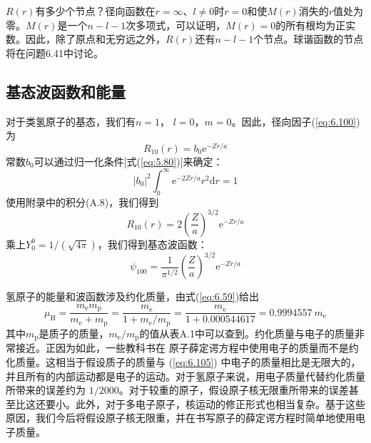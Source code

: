     $R\left(r\right)$有多少个节点？径向函数在$r = \infty$、$l \neq 0$时$r = 0$和使$M\left(r\right)$消失的$r$值处为零。$M\left(r\right)$是一个$n-l-1$次多项式，可以证明，$M\left(r\right) = 0$的所有根均为正实数。因此，除了原点和无穷远之外，$R\left(r\right)$还有$n-l-1$个节点。球谐函数的节点将在问题6.41中讨论。

\subsection*{基态波函数和能量}
    对于类氢原子的基态，我们有$n=1$， $l=0$，$m=0$。因此，径向因子(\ref{eq:6.100})为
    \begin{equation}
        R_{10}\left(r\right) = b_0\mathrm{e}^{-Zr/a}
        \label{eq:6.102}
    \end{equation}
    常数$b_0$可以通过归一化条件[式(\ref{eq:5.80})]来确定：
    \begin{equation*}
        \left|b_0\right|^2\int_{0}^{\infty}\mathrm{e}^{-2Zr/a}r^2\mathrm{d}r = 1
    \end{equation*}
    使用附录中的积分(A.8)，我们得到
    \begin{equation}
        R_{10}\left(r\right) = 2\left(\frac{Z}{a}\right)^{3/2}\mathrm{e}^{-Zr/a}
        \label{eq:6.103}
    \end{equation}
    乘上$Y_0^0 = 1/\left(\sqrt{4\pi}\right)$，我们得到基态波函数：
    \begin{equation}
        \psi_{100} = \frac{1}{\pi^{1/2}}\left(\frac{Z}{a}\right)^{3/2}\mathrm{e}^{-Zr/a}
        \label{eq:6.104}
    \end{equation}

    氢原子的能量和波函数涉及约化质量，由式(\ref{eq:6.59})给出
    \begin{equation}
        \mu_{\mathrm{H}} = \frac{m_{\mathrm{e}}m_{\mathrm{p}}}{m_{\mathrm{e}} + m_{\mathrm{p}}} = \frac{m_{\mathrm{e}}}{1+m_{\mathrm{e}}/m_{\mathrm{p}}} = \frac{m_{\mathrm{e}}}{1+0.000544617} = 0.9994557 \: m_{\mathrm{e}}
        \label{eq:6.105}
    \end{equation}
    其中$m_{\mathrm{p}}$是质子的质量，$m_{\mathrm{e}}/m_{\mathrm{p}}$的值从表A.1中可以查到。约化质量与电子的质量非常接近。正因为如此，一些教科书在  原子薛定谔方程中使用电子的质量而不是约化质量。这相当于假设质子的质量与 (\ref{eq:6.105}) 中电子的质量相比是无限大的，并且所有的内部运动都是电子的运动。对于氢原子来说，用电子质量代替约化质量所带来的误差约为 $1/2000$。对于较重的原子，假设原子核无限重所带来的误差甚至比这还要小。此外，对于多电子原子，核运动的修正形式也相当复杂。基于这些原因，我们今后将假设原子核无限重，并在书写原子的薛定谔方程时简单地使用电子质量。

